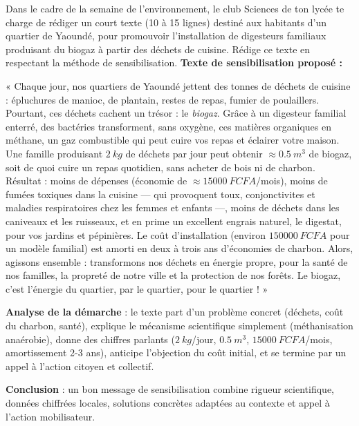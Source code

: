 \documentclass[11pt]{article}
\begin{document}
\begin{exoresolu}
Dans le cadre de la semaine de l'environnement, le club Sciences de ton lycée te charge de rédiger un court texte (10 à 15 lignes) destiné aux habitants d'un quartier de Yaoundé, pour promouvoir l'installation de digesteurs familiaux produisant du biogaz à partir des déchets de cuisine. Rédige ce texte en respectant la méthode de sensibilisation.
\tcblower
\textbf{Texte de sensibilisation proposé :}

« Chaque jour, nos quartiers de Yaoundé jettent des tonnes de déchets de cuisine : épluchures de manioc, de plantain, restes de repas, fumier de poulaillers. Pourtant, ces déchets cachent un trésor : le \emph{biogaz}. Grâce à un digesteur familial enterré, des bactéries transforment, sans oxygène, ces matières organiques en méthane, un gaz combustible qui peut cuire vos repas et éclairer votre maison. Une famille produisant $\SI{2}{kg}$ de déchets par jour peut obtenir $\approx \SI{0,5}{m^3}$ de biogaz, soit de quoi cuire un repas quotidien, sans acheter de bois ni de charbon. Résultat : moins de dépenses (économie de $\approx \SI{15000}{FCFA}$/mois), moins de fumées toxiques dans la cuisine — qui provoquent toux, conjonctivites et maladies respiratoires chez les femmes et enfants —, moins de déchets dans les caniveaux et les ruisseaux, et en prime un excellent engrais naturel, le digestat, pour vos jardins et pépinières. Le coût d'installation (environ $\SI{150000}{FCFA}$ pour un modèle familial) est amorti en deux à trois ans d'économies de charbon. Alors, agissons ensemble : transformons nos déchets en énergie propre, pour la santé de nos familles, la propreté de notre ville et la protection de nos forêts. Le biogaz, c'est l'énergie du quartier, par le quartier, pour le quartier ! »

\textbf{Analyse de la démarche} : le texte part d'un problème concret (déchets, coût du charbon, santé), explique le mécanisme scientifique simplement (méthanisation anaérobie), donne des chiffres parlants ($\SI{2}{kg}$/jour, $\SI{0,5}{m^3}$, $\SI{15000}{FCFA}$/mois, amortissement 2-3 ans), anticipe l'objection du coût initial, et se termine par un appel à l'action citoyen et collectif.

\textbf{Conclusion} : un bon message de sensibilisation combine rigueur scientifique, données chiffrées locales, solutions concrètes adaptées au contexte et appel à l'action mobilisateur.
\end{exoresolu}
\end{document}
